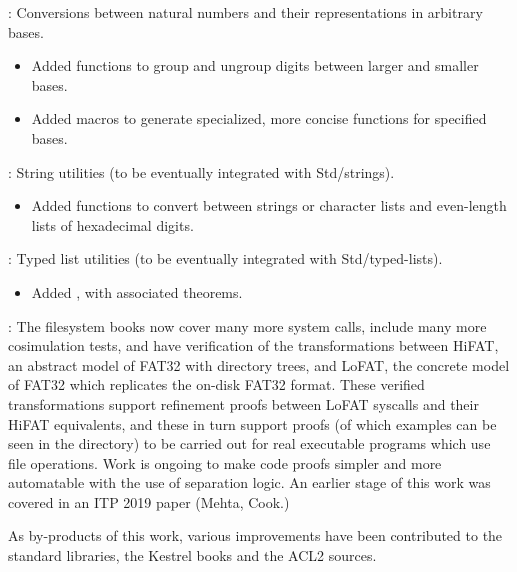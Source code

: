 \begin{frame}

\implibtitle

:
Conversions between natural numbers
and their representations in arbitrary bases.
\begin{itemize}
\item
Added functions to group and ungroup digits between larger and smaller bases.
\item
Added macros to generate specialized, more concise functions
for specified bases.
\end{itemize}

\separation

:
String utilities (to be eventually integrated with Std/strings).
\begin{itemize}
\item
Added functions to convert between strings or character lists
and even-length lists of hexadecimal digits.
\end{itemize}

\separation

:
Typed list utilities (to be eventually integrated with Std/typed-lists).
\begin{itemize}
\item
Added , with associated theorems.
\end{itemize}

\end{frame}


\begin{frame}

\implibtitle

:
The filesystem books now cover many more system calls, include many
more cosimulation tests, and have verification of the transformations
between HiFAT, an abstract model of FAT32 with directory trees, and
LoFAT, the concrete model of FAT32 which replicates the on-disk FAT32
format. These verified transformations support refinement proofs
between LoFAT syscalls and their HiFAT equivalents, and these in turn
support proofs (of which examples can be seen in the directory)
to be carried out for real executable programs which use file
operations. Work is ongoing to make code proofs simpler and more
automatable with the use of separation logic. An earlier stage of
this work was covered in an ITP 2019 paper (Mehta, Cook.)

As by-products of this work, various improvements have been
contributed to the standard libraries, the Kestrel books and the ACL2
sources.

\end{frame}

